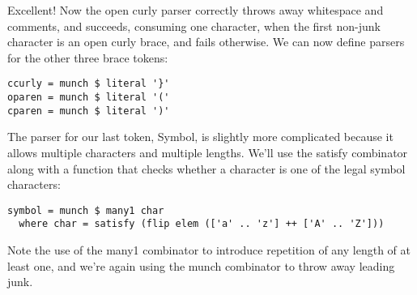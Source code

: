 \documentclass{tmr}
\begin{document}
Excellent!  Now the open curly parser correctly throws away whitespace and comments,
and succeeds, consuming one character, when the first non-junk character is an open 
curly brace, and fails otherwise.
We can now define parsers for the other three brace tokens:
\begin{verbatim}
ccurly = munch $ literal '}'
oparen = munch $ literal '('
cparen = munch $ literal ')'
\end{verbatim}
The parser for our last token, Symbol, is slightly more complicated because it allows
multiple characters and multiple lengths.  We'll use the satisfy combinator along with 
a function that checks whether a character is one of the legal symbol characters:
\begin{verbatim}
symbol = munch $ many1 char
  where char = satisfy (flip elem (['a' .. 'z'] ++ ['A' .. 'Z']))
\end{verbatim}
Note the use of the many1 combinator to introduce repetition of any length of at least one,
and we're again using the munch combinator to throw away leading junk.
\end{document}
